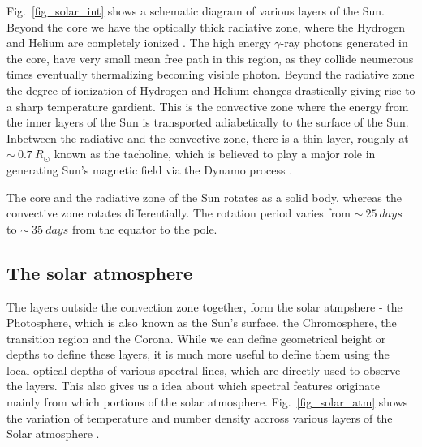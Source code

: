 Fig.~\ref{fig_solar_int} shows a schematic diagram of various layers of the Sun. Beyond the core we have the optically thick radiative zone, where the Hydrogen and Helium are completely ionized . The high energy $\gamma$-ray photons generated in the core, have very small mean free path in this region, as they collide neumerous times eventually thermalizing becoming visible photon. Beyond the radiative zone the degree of ionization of Hydrogen and Helium changes drastically giving rise to a sharp temperature gardient. This is the convective zone where the energy from the inner layers of the Sun is transported adiabetically to the surface of the Sun. Inbetween the radiative and the convective zone, there is a thin layer, roughly at $\sim~0.7~R_{\odot}$ known as the tacholine, which is believed to play a major role in generating Sun's magnetic field via the Dynamo process . 

The core and the radiative zone of the Sun rotates as a solid body, whereas the convective zone rotates differentially. The rotation period varies from $\sim~25~days$ to $\sim~35~days$ from the equator to the pole.

\subsection{The solar atmosphere}\label{solar_atmos}

The layers outside the convection zone together, form the solar atmpshere - the Photosphere, which is also known as the Sun's surface, the Chromosphere, the transition region and the Corona. While we can define geometrical height or depths to define these layers, it is much more useful to define them using the local optical depths of various spectral lines, which are directly used to observe the layers. This also gives us a idea about which spectral features originate mainly from which portions of the solar atmosphere. Fig.~\ref{fig_solar_atm} shows the variation of temperature and number density accross various layers of the Solar atmosphere .

